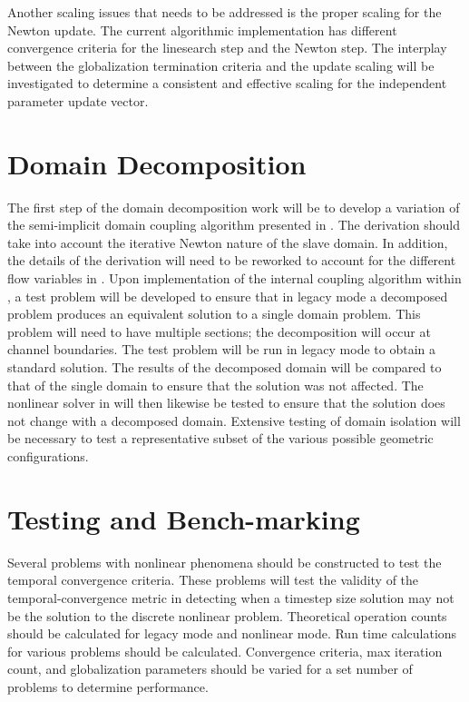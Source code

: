 Another scaling issues that needs to be addressed is the proper scaling for the Newton update.
The current algorithmic implementation has different convergence criteria for the linesearch step and the Newton step.
The interplay between the globalization termination criteria and the update scaling will be investigated to determine a consistent and effective scaling for the independent parameter update vector. 

\section{Domain Decomposition}
\label{sect:domain_coupling}
The first step of the domain decomposition work will be to develop a variation of the semi-implicit domain coupling algorithm presented in .
The derivation should take into account the iterative Newton nature of the slave domain. 
In addition, the details of the derivation will need to be reworked to account for the different flow variables in \cobra{}.
Upon implementation of the internal coupling algorithm within \cobra{}, a test problem will be developed to ensure that in legacy mode a decomposed problem produces an equivalent solution to a single domain problem.
This problem will need to have multiple sections; the decomposition will occur at channel boundaries.
The test problem will be run in legacy mode to obtain a standard solution.
The results of the decomposed domain will be compared to that of the single domain to ensure that the solution was not affected.
The nonlinear solver in \cobra{} will then likewise be tested to ensure that the solution does not change with a decomposed domain.
Extensive testing of domain isolation will be necessary to test a representative subset of the various possible geometric configurations.

\section{Testing and Bench-marking}
\label{sect:proposal_temporal_testing}
Several problems with nonlinear phenomena should be constructed to test the temporal convergence criteria.
These problems will test the validity of the temporal-convergence metric in detecting when a timestep size solution may not be the solution to the discrete nonlinear problem.
Theoretical operation counts should be calculated for legacy mode and nonlinear mode.
Run time calculations for various problems should be calculated.
Convergence criteria, max iteration count, and globalization parameters should be varied for a set number of problems to determine performance.


